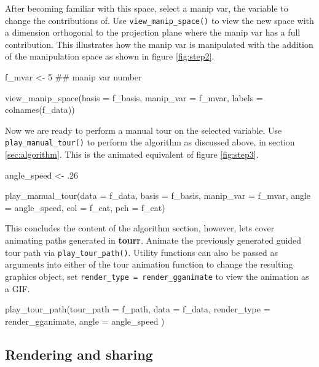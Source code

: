 After becoming familiar with this space, select a manip var, the
variable to change the contributions of. Use
\texttt{view\_manip\_space()} to view the new space with a dimension
orthogonal to the projection plane where the manip var has a full
contribution. This illustrates how the manip var is manipulated with the
addition of the manipulation space as shown in figure \ref{fig:step2}.

\begin{Schunk}
\begin{Sinput}
f_mvar  <- 5  ## manip var number

view_manip_space(basis = f_basis, 
                 manip_var = f_mvar, 
                 labels = colnames(f_data))
\end{Sinput}
\end{Schunk}

Now we are ready to perform a manual tour on the selected variable. Use
\texttt{play\_manual\_tour()} to perform the algorithm as discussed
above, in section \ref{sec:algorithm}. This is the animated equivalent
of figure \ref{fig:step3}.

\begin{Schunk}
\begin{Sinput}
angle_speed <- .26

play_manual_tour(data = f_data,
                 basis = f_basis, 
                 manip_var = f_mvar, 
                 angle = angle_speed,
                 col = f_cat,
                 pch = f_cat)
\end{Sinput}
\end{Schunk}

This concludes the content of the algorithm section, however, lets cover
animating paths generated in \textbf{tourr}. Animate the previously
generated guided tour path via \texttt{play\_tour\_path()}. Utility
functions can also be passed as arguments into either of the tour
animation function to change the resulting graphics object, set
\texttt{render\_type\ =\ render\_gganimate} to view the animation as a
GIF.

\begin{Schunk}
\begin{Sinput}
play_tour_path(tour_path = f_path,
               data = f_data,
               render_type = render_gganimate, 
               angle = angle_speed
)
\end{Sinput}
\end{Schunk}

\hypertarget{rendering-and-sharing}{%
\subsection{Rendering and sharing}\label{rendering-and-sharing}}

